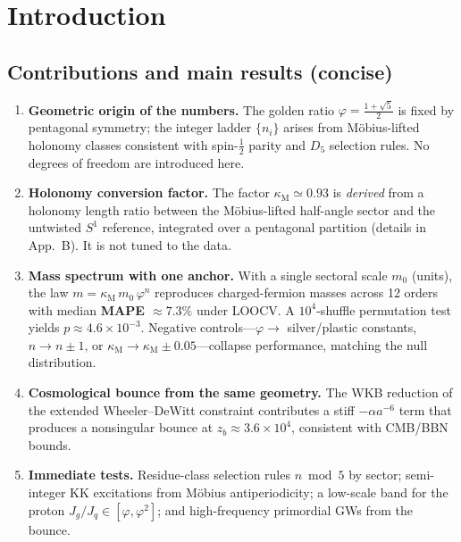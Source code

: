 \documentclass[12pt]{article}
\begin{document}
\clearpage

\section{Introduction}

\subsection*{Contributions and main results (concise)}
\label{intro:contrib-main}
\begin{enumerate}
\item \textbf{Geometric origin of the numbers.} The golden ratio $\varphi=\tfrac{1+\sqrt{5}}{2}$ is fixed by pentagonal symmetry; the integer ladder $\{n_i\}$ arises from Möbius-lifted holonomy classes consistent with spin-$\tfrac12$ parity and $D_5$ selection rules. No degrees of freedom are introduced here.
\item \textbf{Holonomy conversion factor.} The factor $\kappa_{\mathrm{M}}\simeq 0.93$ is \emph{derived} from a holonomy length ratio between the Möbius-lifted half-angle sector and the untwisted $S^{1}$ reference, integrated over a pentagonal partition (details in App.~B). It is not tuned to the data.
\item \textbf{Mass spectrum with one anchor.} With a single sectoral scale $m_0$ (units), the law $m=\kappa_{\mathrm{M}}\,m_0\,\varphi^{n}$ reproduces charged-fermion masses across 12 orders with median \textbf{MAPE $\approx 7.3\%$} under LOOCV. A $10^4$-shuffle permutation test yields \textbf{$p\approx4.6\times10^{-3}$}. Negative controls---$\varphi\!\to$ silver/plastic constants, $n\!\to n\pm1$, or $\kappa_{\mathrm{M}}\!\to\kappa_{\mathrm{M}}\pm0.05$---collapse performance, matching the null distribution.
\item \textbf{Cosmological bounce from the same geometry.} The WKB reduction of the extended Wheeler--DeWitt constraint contributes a stiff $-\alpha a^{-6}$ term that produces a nonsingular bounce at \textbf{$z_b\!\approx\!3.6\times10^{4}$}, consistent with CMB/BBN bounds.
\item \textbf{Immediate tests.} Residue-class selection rules $n\bmod 5$ by sector; semi-integer KK excitations from Möbius antiperiodicity; a low-scale band for the proton $J_g/J_q\in[\varphi,\varphi^2]$; and high-frequency primordial GWs from the bounce.
\end{enumerate}
\end{document}
